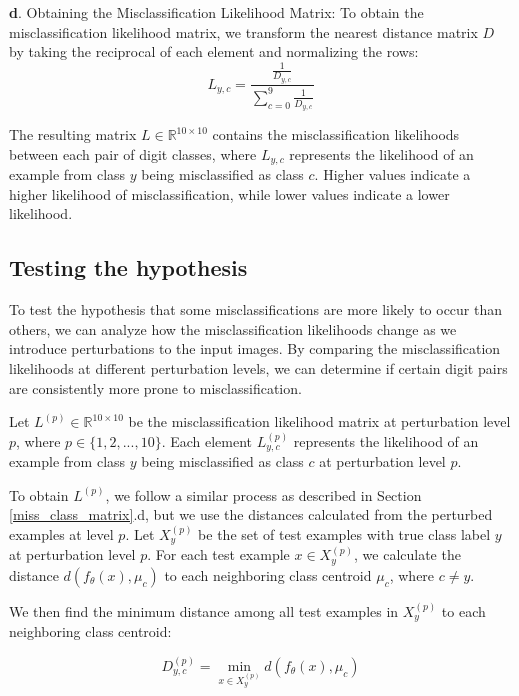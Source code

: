 \textbf{d}. Obtaining the Misclassification Likelihood Matrix:
To obtain the misclassification likelihood matrix, we transform the nearest distance matrix $D$ by taking the reciprocal of each element and normalizing the rows:
\begin{equation}
L_{y,c} = \frac{\frac{1}{D_{y,c}}}{\sum\limits_{c=0}^9 \frac{1}{D_{y,c}}}
\label{eq:reciprocal_distance_matrix_eg_likelihood_matrix}
\end{equation}

The resulting matrix $L \in \mathbb{R}^{10 \times 10}$ contains the misclassification likelihoods between each pair of digit classes, where $L_{y,c}$ represents the likelihood of an example from class $y$ being misclassified as class $c$. Higher values indicate a higher likelihood of misclassification, while lower values indicate a lower likelihood.

\subsection{Testing the hypothesis}

To test the hypothesis that some misclassifications are more likely to occur than others, we can analyze how the misclassification likelihoods change as we introduce perturbations to the input images. By comparing the misclassification likelihoods at different perturbation levels, we can determine if certain digit pairs are consistently more prone to misclassification.

Let $L^{(p)} \in \mathbb{R}^{10 \times 10}$ be the misclassification likelihood matrix at perturbation level $p$, where $p \in \{1, 2, ..., 10\}$. Each element $L^{(p)}_{y,c}$ represents the likelihood of an example from class $y$ being misclassified as class $c$ at perturbation level $p$.

To obtain $L^{(p)}$, we follow a similar process as described in Section \ref{miss_class_matrix}.d, but we use the distances calculated from the perturbed examples at level $p$. Let $X^{(p)}_y$ be the set of test examples with true class label $y$ at perturbation level $p$. For each test example $x \in X^{(p)}_y$, we calculate the distance $d(f_\theta(x), \mu_c)$ to each neighboring class centroid $\mu_c$, where $c \neq y$.

We then find the minimum distance among all test examples in $X^{(p)}_y$ to each neighboring class centroid:

\begin{equation}
D^{(p)}_{y,c} = \min_{x \in X^{(p)}_y} d(f_\theta(x), \mu_c)    
\end{equation}

